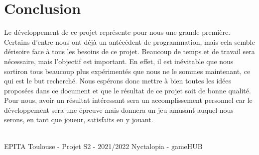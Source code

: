 \section{Conclusion}

Le développement de ce projet représente pour nous une grande première.
Certains d’entre nous ont déjà un antécédent de programmation, mais cela
semble dérisoire face à tous les besoins de ce projet. Beaucoup de temps et de
travail sera nécessaire, mais l’objectif est important. En effet, il est inévitable
que nous sortiron tous beaucoup plus expérimentés que nous ne le sommes maintenant, ce qui est le but recherché. Nous espérons donc mettre à bien toutes les
idées proposées dans ce document et que le résultat de ce projet soit de bonne
qualité. Pour nous, avoir un résultat intéressant sera un accomplissement personnel car le développement sera une épreuve mais donnera un jeu amusant
auquel nous serons, en tant que joueur, satisfaits en y jouant.

\vfill
\noindent\makebox[\linewidth]{\rule{.8\paperwidth}{.6pt}}\\[0.2cm]
EPITA Toulouse - Projet S2 - 2021/2022 \hfill Nyctalopia - gameHUB
\noindent\makebox[\linewidth]{\rule{.8\paperwidth}{.6pt}}

\newpage